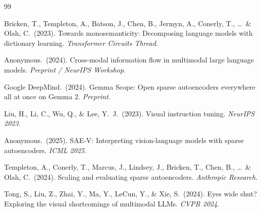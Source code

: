 \documentclass[11pt,a4paper]{article}
\begin{document}



\begin{thebibliography}{99}

Bricken, T., Templeton, A., Batson, J., Chen, B., Jermyn, A., Conerly, T., \ldots\ \& Olah, C.\
  (2023).
Towards monosemanticity: Decomposing language models with dictionary learning.
\textit{Transformer Circuits Thread}.

Anonymous.\ (2024).
Cross-modal information flow in multimodal large language models.
\textit{Preprint / NeurIPS Workshop}.

Google DeepMind.\ (2024).
Gemma Scope: Open sparse autoencoders everywhere all at once on Gemma 2.
\textit{Preprint}.

Liu, H., Li, C., Wu, Q., \& Lee, Y.\ J.\ (2023).
Visual instruction tuning.
\textit{NeurIPS 2023}.

Anonymous.\ (2025).
SAE-V: Interpreting vision-language models with sparse autoencoders.
\textit{ICML 2025}.

Templeton, A., Conerly, T., Marcus, J., Lindsey, J., Bricken, T., Chen, B., \ldots\ \& Olah, C.\
  (2024).
Scaling and evaluating sparse autoencoders.
\textit{Anthropic Research}.

Tong, S., Liu, Z., Zhai, Y., Ma, Y., LeCun, Y., \& Xie, S.\ (2024).
Eyes wide shut? Exploring the visual shortcomings of multimodal LLMs.
\textit{CVPR 2024}.

\end{thebibliography}
\end{document}
